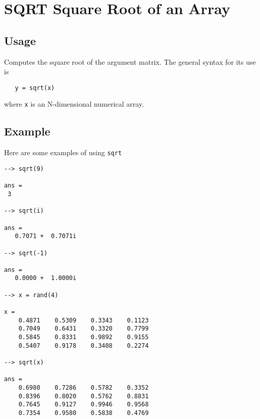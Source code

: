 \section{SQRT Square Root of an Array}

\subsection{Usage}

Computes the square root of the argument matrix.  The general
syntax for its use is
\begin{verbatim}
   y = sqrt(x)
\end{verbatim}
where \verb|x| is an N-dimensional numerical array.
\subsection{Example}

Here are some examples of using \verb|sqrt|
\begin{verbatim}
--> sqrt(9)

ans = 
 3 

--> sqrt(i)

ans = 
   0.7071 +  0.7071i 

--> sqrt(-1)

ans = 
   0.0000 +  1.0000i 

--> x = rand(4)

x = 
    0.4871    0.5309    0.3343    0.1123 
    0.7049    0.6431    0.3320    0.7799 
    0.5845    0.8331    0.9892    0.9155 
    0.5407    0.9178    0.3408    0.2274 

--> sqrt(x)

ans = 
    0.6980    0.7286    0.5782    0.3352 
    0.8396    0.8020    0.5762    0.8831 
    0.7645    0.9127    0.9946    0.9568 
    0.7354    0.9580    0.5838    0.4769 
\end{verbatim}
